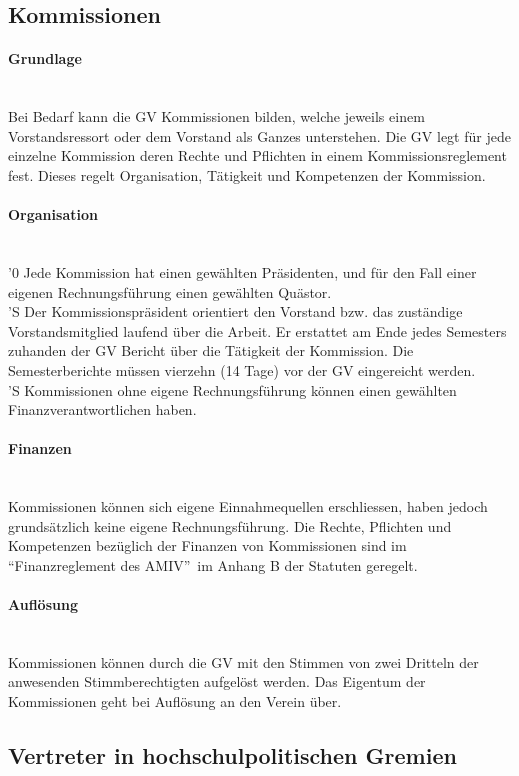 \documentclass[a4paper,11pt]{article}
\newcommand{\nl}{\\[1.5ex]}
\begin{document}
\subsection{Kommissionen}
\paragraph{Grundlage} \ \\
Bei Bedarf kann die GV Kommissionen bilden, welche jeweils einem Vorstandsressort oder dem Vorstand als Ganzes unterstehen. Die GV legt für jede einzelne Kommission deren Rechte und Pflichten in einem Kommissionsreglement fest. Dieses regelt Organisation, Tätigkeit und Kompetenzen der Kommission.


\paragraph{Organisation} \ \\
'0 Jede Kommission hat einen gewählten Präsidenten, und für den Fall einer eigenen Rechnungsführung einen gewählten Quästor. \nl
'S Der Kommissionspräsident orientiert den Vorstand bzw. das zuständige Vorstandsmitglied laufend über die Arbeit. Er erstattet am Ende jedes Semesters zuhanden der GV Bericht über die Tätigkeit der Kommission. Die Semesterberichte müssen vierzehn (14 Tage) vor der GV eingereicht werden.\nl
'S Kommissionen ohne eigene Rechnungsführung können einen gewählten Finanzverantwortlichen haben.


\paragraph{Finanzen} \ \\
Kommissionen können sich eigene Einnahmequellen erschliessen, haben jedoch grundsätzlich keine eigene Rechnungsführung. Die Rechte, Pflichten und Kompetenzen bezüglich der Finanzen von Kommissionen sind im ``Finanzreglement des AMIV''\ im Anhang B der Statuten geregelt.


\paragraph{Auflösung} \ \\
Kommissionen können durch die GV mit den Stimmen von zwei Dritteln der anwesenden Stimmberechtigten aufgelöst werden. Das Eigentum der Kommissionen geht bei Auflösung an den Verein über.


\subsection{Vertreter in hochschulpolitischen Gremien}
\end{document}
